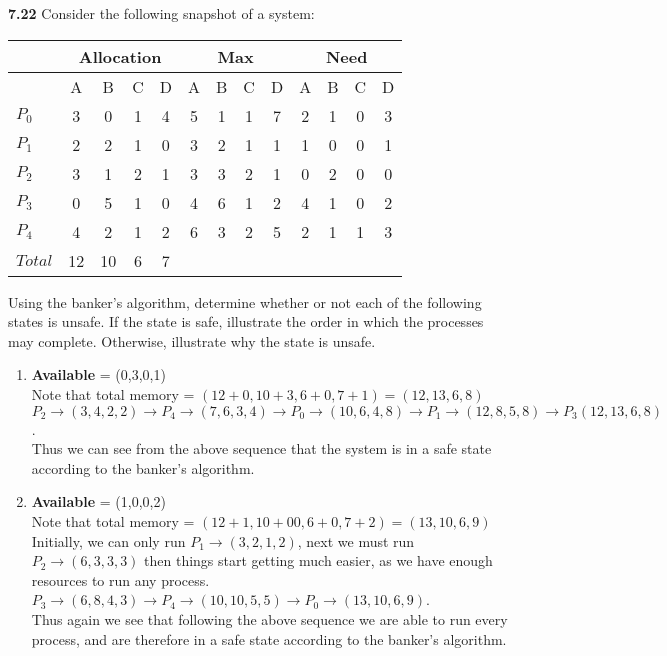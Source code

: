 \documentclass[12pt]{jhwhw}
\begin{document}
	\begin{addmargin}[1em]{}
	\end{addmargin}

\clearpage
\textbf{7.22}  
	Consider the following snapshot of a system: \bigbreak
	\begin{tabular}{|l||c|c|c|c||c|c|c|c||c|c|c|c|}
		\hline
		& \multicolumn{4}{|c||}{Allocation} & \multicolumn{4}{|c||}{Max} & \multicolumn{4}{|c|}{Need} \\ \hline
		& A & B & C & D & A & B & C & D & A & B & C & D\\ \hline
		$P_0$ & 3 & 0 & 1 & 4 & 5 & 1 & 1 & 7 & 2 & 1 & 0 & 3 \\ \hline
		$P_1$ & 2 & 2 & 1 & 0 & 3 & 2 & 1 & 1 & 1 & 0 & 0 & 1 \\ \hline
		$P_2$ & 3 & 1 & 2 & 1 & 3 & 3 & 2 & 1 & 0 & 2 & 0 & 0 \\ \hline
		$P_3$ & 0 & 5 & 1 & 0 & 4 & 6 & 1 & 2 & 4 & 1 & 0 & 2 \\ \hline
		$P_4$ & 4 & 2 & 1 & 2 & 6 & 3 & 2 & 5 & 2 & 1 & 1 & 3 \\ \hline\hline
		$Total$ & 12 & 10 & 6 & 7 & & & & & & & & \\ \hline
	\end{tabular}

	\bigbreak
	Using the banker's algorithm, determine whether or not each of the following states is unsafe.
	If the state is safe, illustrate the order in which the processes may complete. Otherwise, illustrate why 
	the state is unsafe. \\
	\begin{enumerate}
		\item \textbf{Available} = (0,3,0,1) \\
			Note that total memory = $(12+0, 10+3, 6+0, 7+1) = (12, 13, 6, 8)$ \\
			$P_2 \rightarrow (3,4,2,2) \rightarrow P_4 \rightarrow (7, 6, 3, 4)
			\rightarrow P_0 \rightarrow (10, 6, 4, 8) \rightarrow P_1 \rightarrow (12, 8, 5, 8)
			\rightarrow P_3 (12, 13, 6, 8)
			$. \\
			Thus we can see from the above sequence that the system is in a safe state according
			to the banker's algorithm.
		\item \textbf{Available} = (1,0,0,2) \\
			Note that total memory = $(12+1, 10+00, 6+0, 7+2) = (13, 10, 6, 9)$ \\
			Initially, we can only run $P_1 \rightarrow (3, 2, 1, 2)$, next we must
			run $P_2 \rightarrow (6, 3, 3, 3)$ then things start getting much easier,
			as we have enough resources to run any process. $P_3 \rightarrow (6, 8, 4, 3)
			\rightarrow P_4 \rightarrow (10, 10, 5, 5) \rightarrow P_0 \rightarrow (13, 10, 6, 9)$. \\
			Thus again we see that following the above sequence we are able to run every process, and are
			therefore in a safe state according to the banker's algorithm.
	\end{enumerate}
\bigbreak
\end{document}
